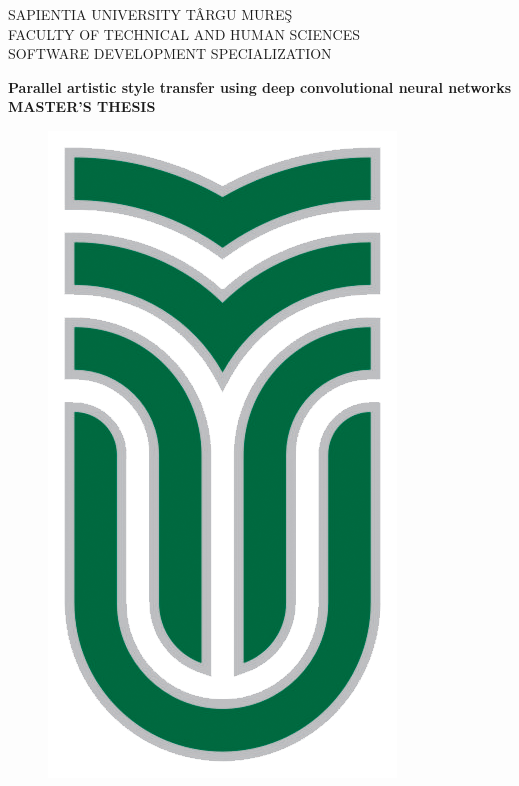 \documentclass[12pt, a4paper, oneside]{book}
\theoremstyle{tetel}
\begin{document}

\newpage
\thispagestyle{empty}
\begin{center}
    \Large SAPIENTIA UNIVERSITY TÂRGU MURE\c{S}\\
    \Large FACULTY OF TECHNICAL AND HUMAN SCIENCES\\
    \Large SOFTWARE DEVELOPMENT SPECIALIZATION\\
\end{center}

\begin{center}
    \vspace{3cm}\LARGE \textbf{Parallel artistic style transfer using deep convolutional neural networks}\\
    \vspace{1cm}\LARGE \textbf{MASTER'S THESIS}\\
\end{center}

\vspace{2cm}
\begin{figure}[htb]
	\begin{center}
		\includegraphics{sapientia_logo.png}
	\end{center}
\end{figure}
\end{document}
